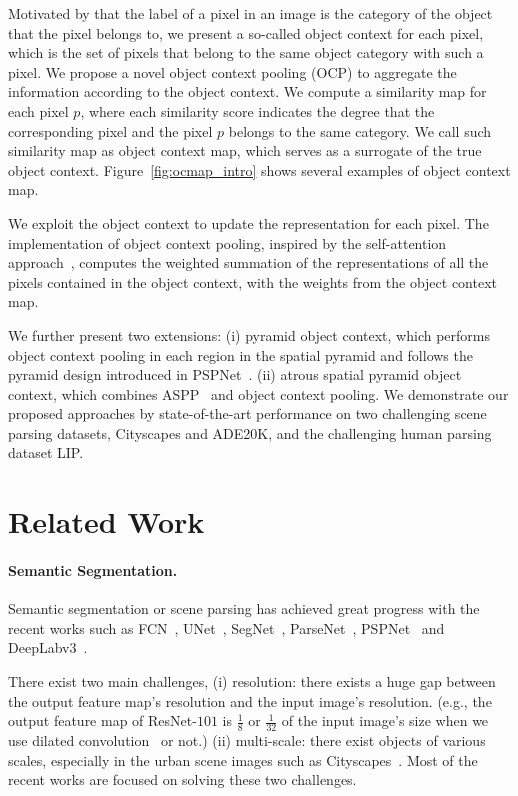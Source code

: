 \documentclass[10pt,twocolumn,letterpaper]{article}
\begin{document}
Motivated by that
the label of a pixel in an image is
the category of the object that the pixel belongs to,
we present a so-called object context for each pixel,
which is the set of pixels that belong to the same object category
with such a pixel.
We propose a novel object context pooling (OCP) to
aggregate the information according to the object context.
We compute a similarity map for each pixel $p$,
where each similarity score indicates
the degree that the corresponding pixel and the pixel $p$ belongs
to the same category.
We call such similarity map as object context map,
which serves as a surrogate of the true object context.
Figure~\ref{fig:ocmap_intro}
shows several examples of object context map.

We exploit the object context
to update the representation for each pixel.
The implementation of object context pooling,
inspired by the self-attention approach~\cite{lin2017structured, vaswani2017attention},
computes the weighted summation of
the representations of all the pixels contained
in the object context,
with the weights from the object context map.

We further present two extensions:
(i) pyramid object context,
which performs object context pooling
in each region in the spatial pyramid and follows the pyramid design
introduced in PSPNet~\cite{zhao2017pyramid}.
(ii) atrous spatial pyramid object context,
which combines ASPP~\cite{chen2017rethinking} and object context pooling.
We demonstrate our proposed approaches
by state-of-the-art performance on two challenging scene parsing datasets, Cityscapes and ADE20K,
and the challenging human parsing dataset LIP.

\section{Related Work}

\paragraph{Semantic Segmentation.}
Semantic segmentation or scene parsing has achieved great progress with the recent works such as FCN~\cite{long2015fully}, UNet~\cite{ronneberger2015u}, SegNet~\cite{badrinarayanan2015segnet}, ParseNet~\cite{liu2015parsenet}, PSPNet~\cite{zhao2017pyramid} and DeepLabv3~\cite{chen2017rethinking}.

There exist two main challenges, (i) resolution: there exists a huge gap between the output feature map's resolution and the input image's resolution. (e.g., the output feature map of ResNet-$101$ is $\frac{1}{8}$ or $\frac{1}{32}$ of the input image's size when we use dilated convolution~\cite{yu2015multi} or not.)
(ii) multi-scale: there exist objects of various scales, especially in the urban scene images such as Cityscapes~\cite{cordts2016cityscapes}. Most of the recent works are focused on solving these two challenges.
\end{document}
